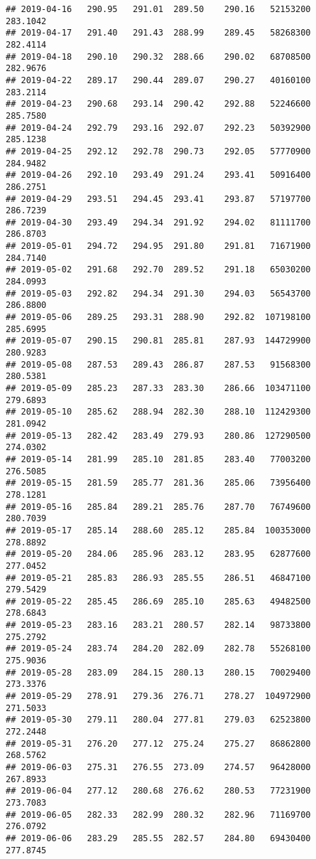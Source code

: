 \documentclass[
]{article}
\begin{document}
\begin{verbatim}
## 2019-04-16   290.95   291.01  289.50    290.16   52153200     283.1042
## 2019-04-17   291.40   291.43  288.99    289.45   58268300     282.4114
## 2019-04-18   290.10   290.32  288.66    290.02   68708500     282.9676
## 2019-04-22   289.17   290.44  289.07    290.27   40160100     283.2114
## 2019-04-23   290.68   293.14  290.42    292.88   52246600     285.7580
## 2019-04-24   292.79   293.16  292.07    292.23   50392900     285.1238
## 2019-04-25   292.12   292.78  290.73    292.05   57770900     284.9482
## 2019-04-26   292.10   293.49  291.24    293.41   50916400     286.2751
## 2019-04-29   293.51   294.45  293.41    293.87   57197700     286.7239
## 2019-04-30   293.49   294.34  291.92    294.02   81111700     286.8703
## 2019-05-01   294.72   294.95  291.80    291.81   71671900     284.7140
## 2019-05-02   291.68   292.70  289.52    291.18   65030200     284.0993
## 2019-05-03   292.82   294.34  291.30    294.03   56543700     286.8800
## 2019-05-06   289.25   293.31  288.90    292.82  107198100     285.6995
## 2019-05-07   290.15   290.81  285.81    287.93  144729900     280.9283
## 2019-05-08   287.53   289.43  286.87    287.53   91568300     280.5381
## 2019-05-09   285.23   287.33  283.30    286.66  103471100     279.6893
## 2019-05-10   285.62   288.94  282.30    288.10  112429300     281.0942
## 2019-05-13   282.42   283.49  279.93    280.86  127290500     274.0302
## 2019-05-14   281.99   285.10  281.85    283.40   77003200     276.5085
## 2019-05-15   281.59   285.77  281.36    285.06   73956400     278.1281
## 2019-05-16   285.84   289.21  285.76    287.70   76749600     280.7039
## 2019-05-17   285.14   288.60  285.12    285.84  100353000     278.8892
## 2019-05-20   284.06   285.96  283.12    283.95   62877600     277.0452
## 2019-05-21   285.83   286.93  285.55    286.51   46847100     279.5429
## 2019-05-22   285.45   286.69  285.10    285.63   49482500     278.6843
## 2019-05-23   283.16   283.21  280.57    282.14   98733800     275.2792
## 2019-05-24   283.74   284.20  282.09    282.78   55268100     275.9036
## 2019-05-28   283.09   284.15  280.13    280.15   70029400     273.3376
## 2019-05-29   278.91   279.36  276.71    278.27  104972900     271.5033
## 2019-05-30   279.11   280.04  277.81    279.03   62523800     272.2448
## 2019-05-31   276.20   277.12  275.24    275.27   86862800     268.5762
## 2019-06-03   275.31   276.55  273.09    274.57   96428000     267.8933
## 2019-06-04   277.12   280.68  276.62    280.53   77231900     273.7083
## 2019-06-05   282.33   282.99  280.32    282.96   71169700     276.0792
## 2019-06-06   283.29   285.55  282.57    284.80   69430400     277.8745

\end{verbatim}
\end{document}
